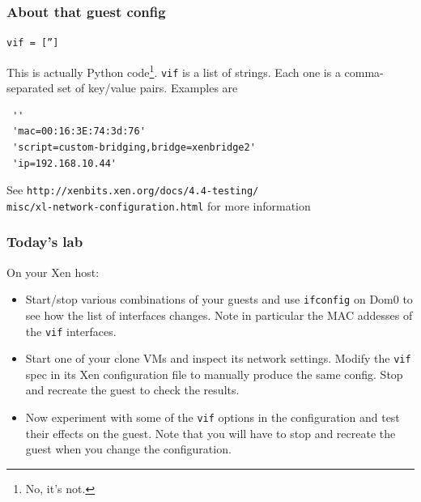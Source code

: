 \documentclass[10pt]{beamer}
\begin{document}
\begin{frame}[fragile]
  \frametitle{About that guest config}
  
  
   
   \texttt{vif = ['']}
  
  \vspace{5mm}
This is actually Python code\footnote{No, it's not.}. \texttt{vif} is a list of strings. Each one is a comma-separated  set of
key/value pairs. Examples are

\begin{verbatim}
 ''
 'mac=00:16:3E:74:3d:76'
 'script=custom-bridging,bridge=xenbridge2'
 'ip=192.168.10.44'
\end{verbatim}

See \texttt{http://xenbits.xen.org/docs/4.4-testing/ \\ misc/xl-network-configuration.html} for more information


\end{frame}

\begin{frame}
  \frametitle{Today's lab}

  On your Xen host:
\begin{itemize}
    \item Start/stop various combinations of your guests and use \texttt{ifconfig} on Dom0 to see
    how the list of interfaces changes. Note in particular the MAC addesses of the \texttt{vif} interfaces.
    \item Start one of your clone VMs and inspect its network settings. Modify the \texttt{vif} spec
    in its Xen configuration file to manually produce the same config. Stop and recreate the guest 
    to check the results.
    \item Now experiment with some of the \texttt{vif} options in the configuration and test their effects on 
    the guest. Note that you will have to stop and recreate the guest when you change the configuration.
  \end{itemize}
\end{frame}
\end{document}
